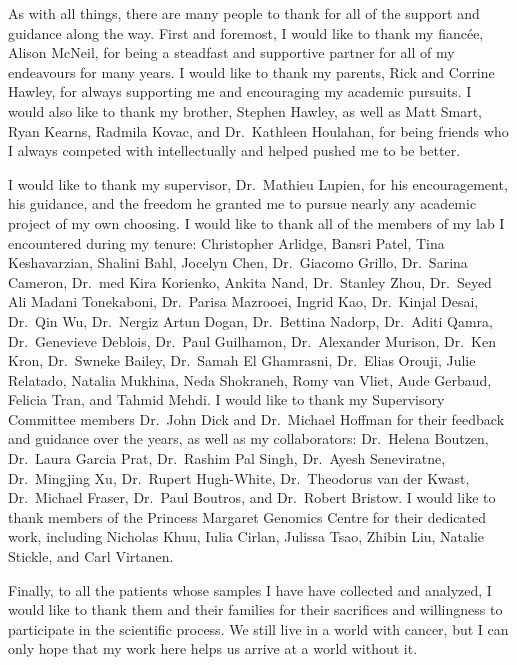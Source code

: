 \begin{acknowledgements}

  As with all things, there are many people to thank for all of the support and guidance along the way.
  First and foremost, I would like to thank my fianc\'ee, Alison McNeil, for being a steadfast and supportive partner for all of my endeavours for many years.
  I would like to thank my parents, Rick and Corrine Hawley, for always supporting me and encouraging my academic pursuits.
  I would also like to thank my brother, Stephen Hawley, as well as Matt Smart, Ryan Kearns, Radmila Kovac, and Dr.~Kathleen Houlahan, for being friends who I always competed with intellectually and helped pushed me to be better.

  I would like to thank my supervisor, Dr.~Mathieu Lupien, for his encouragement, his guidance, and the freedom he granted me to pursue nearly any academic project of my own choosing.
  I would like to thank all of the members of my lab I encountered during my tenure: Christopher Arlidge, Bansri Patel, Tina Keshavarzian, Shalini Bahl, Jocelyn Chen, Dr.~Giacomo Grillo, Dr.~Sarina Cameron, Dr.~med Kira Korienko, Ankita Nand, Dr.~Stanley Zhou, Dr.~Seyed Ali Madani Tonekaboni, Dr.~Parisa Mazrooei, Ingrid Kao, Dr.~Kinjal Desai, Dr.~Qin Wu, Dr.~Nergiz Artun Dogan, Dr.~Bettina Nadorp, Dr.~Aditi Qamra, Dr.~Genevieve Deblois, Dr.~Paul Guilhamon, Dr.~Alexander Murison, Dr.~Ken Kron, Dr.~Swneke Bailey, Dr.~Samah El Ghamrasni, Dr.~Elias Orouji, Julie Relatado, Natalia Mukhina, Neda Shokraneh, Romy van Vliet, Aude Gerbaud, Felicia Tran, and Tahmid Mehdi.
  I would like to thank my Supervisory Committee members Dr.~John Dick and Dr.~Michael Hoffman for their feedback and guidance over the years, as well as my collaborators: Dr.~Helena Boutzen, Dr.~Laura Garcia Prat, Dr.~Rashim Pal Singh, Dr.~Ayesh Seneviratne, Dr.~Mingjing Xu, Dr.~Rupert Hugh-White, Dr.~Theodorus van der Kwast, Dr.~Michael Fraser, Dr.~Paul Boutros, and Dr.~Robert Bristow.
  I would like to thank members of the Princess Margaret Genomics Centre for their dedicated work, including Nicholas Khuu, Iulia Cirlan, Julissa Tsao, Zhibin Liu, Natalie Stickle, and Carl Virtanen.

  Finally, to all the patients whose samples I have have collected and analyzed, I would like to thank them and their families for their sacrifices and willingness to participate in the scientific process.
  We still live in a world with cancer, but I can only hope that my work here helps us arrive at a world without it.
\end{acknowledgements}
